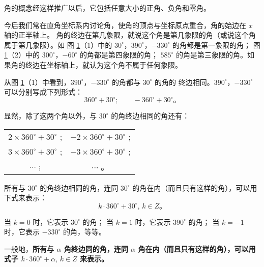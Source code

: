 角的概念经这样推广以后，它包括任意大小的正角、负角和零角。

今后我们常在直角坐标系内讨论角，使角的顶点与坐标原点重合，角的始边在 $x$ 轴的正半轴上。
角的终边在第几象限，就说这个角是第几象限的角（或说这个角属于第几象限）。如
图 \ref{fig:2-4}（1）中的 $30^\circ$，$390^\circ$，$-330^\circ$ 的角都是第一象限的角；
图 \ref{fig:2-4}（2）中的 $300^\circ$，$-60^\circ$ 的角都是第四象限的角；
$585^\circ$ 的角是第三象限的角。如果角的终边在坐标轴上，就认为这个角不属于任何象限。

\begin{figure}[htbp]
    \centering
    \begin{minipage}{8cm}
    \centering
    
    \caption*{（1）}
    \end{minipage}
    \qquad
    \begin{minipage}{8cm}
    \centering
    
    \caption*{（2）}
    \end{minipage}
    \caption{}\label{fig:2-4}
\end{figure}

从图 \ref{fig:2-4}（1）中看到，$390^\circ$，$-330^\circ$ 的角都与 $30^\circ$ 的角的
终边相同。$390^\circ$，$-330^\circ$ 可以分别写成下列形式：
$$360^\circ + 30^\circ; \qquad -360^\circ + 30^\circ \text{。}$$

显然，除了这两个角以外，与 $30^\circ$ 的角终边相同的角还有：

\begin{center}
    \begin{tabular}[t]{*{2}{@{}c}}
        $2 \times 360^\circ + 30^\circ$ ; & \qquad $-2 \times 360^\circ + 30^\circ$ ; \\
        $3 \times 360^\circ + 30^\circ$ ; & \qquad $-3 \times 360^\circ + 30^\circ$ ; \\
        $\cdots$ ; & $\cdots$ 。
    \end{tabular}
\end{center}

所有与 $30^\circ$ 的角终边相同的角，连同 $30^\circ$ 的角在内（而且只有这样的角），可以用下式来表示：
$$k \cdot 360^\circ + 30^\circ , \, k \in Z \text{。}$$

当 $k = 0$ 时，它表示 $30^\circ$ 的角；
当 $k = 1$ 时，它表示 $390^\circ$ 的角；
当 $k = -1$ 时，它表示 $-330^\circ$ 的角，等等。

一般地，\textbf{所有与 $\alpha$ 角終边同的角，连同 $\alpha$ 角在内（而且只有这样的角），可以用式子
$k \cdot 360^\circ + \alpha , \, k \in Z$ 来表示。}

